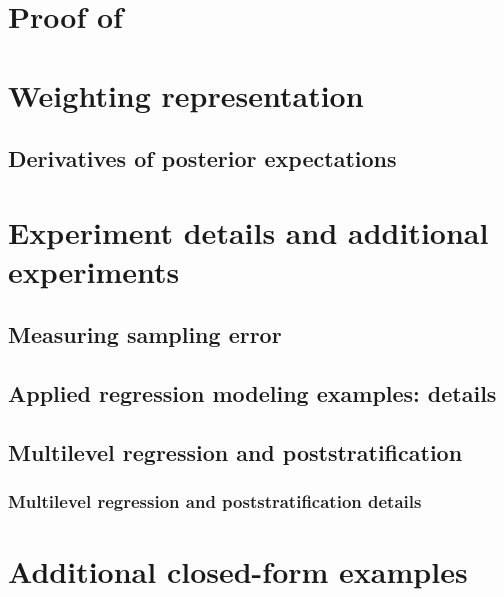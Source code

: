 \section{Proof of }


\section{Weighting representation}



\subsection{Derivatives of posterior expectations}




\newpage
\section{Experiment details and additional experiments}

\subsection{Measuring sampling error}


\subsection{Applied regression modeling examples: details}


\subsection{Multilevel regression and poststratification}


\subsubsection{Multilevel regression and poststratification details}





\newpage
\section{Additional closed-form examples}






